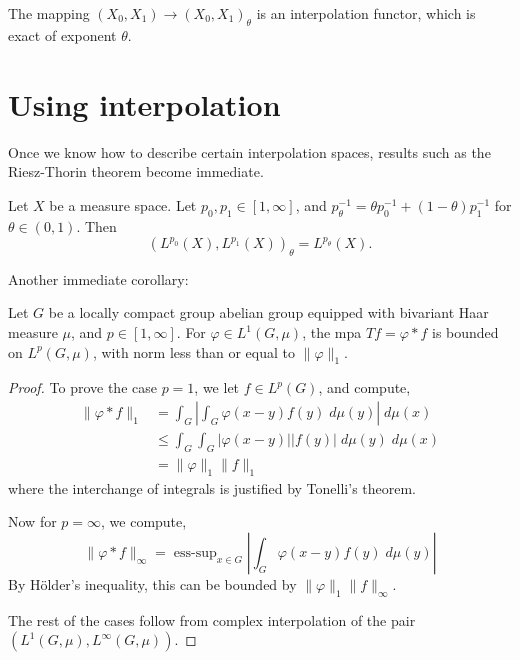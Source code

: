 \begin{proposition}
    The mapping $(X_0,X_1)\rightarrow (X_0,X_1)_\theta$ is an interpolation
    functor, which is exact of exponent $\theta$.
\end{proposition}

\section{Using interpolation}
Once we know how to describe certain interpolation spaces, results
such as the Riesz-Thorin theorem become immediate.
\begin{proposition}
    Let $X$ be a measure space.
    Let $p_0,p_1 \in [1,\infty]$, and $p_\theta^{-1} = \theta p_0^{-1}+(1-\theta)p_1^{-1}$
    for $\theta \in (0,1)$.
    Then
    \begin{equation*}
        (L^{p_0}(X),L^{p_1}(X))_\theta = L^{p_\theta}(X).
    \end{equation*}
\end{proposition}

Another immediate corollary:
\begin{proposition}
    Let $G$ be a locally compact group abelian group equipped
    with bivariant Haar measure $\mu$, and $p \in [1,\infty]$. For $\varphi \in L^1(G,\mu)$, the mpa
    $Tf = \varphi * f$ is bounded on $L^p(G,\mu)$, with norm less than or equal
    to $\|\varphi\|_1$.
\end{proposition}
\begin{proof}
    To prove the case $p = 1$, we let $f \in L^p(G)$, and compute,
    \begin{align*}
        \|\varphi * f\|_1 &= \int_G \left|\int_G\varphi(x-y)f(y)\;d\mu(y)\right|\;d\mu(x)\\
        &\leq \int_G \int_G |\varphi(x-y)||f(y)|\;d\mu(y)\;d\mu(x)\\
        &= \|\varphi\|_1\|f\|_1
    \end{align*}
    where the interchange of integrals is justified by Tonelli's theorem.
    
    Now for $p = \infty$, we compute,
    \begin{equation*}
        \|\varphi*f\|_\infty = \operatorname{ess-sup}_{x \in G} \left|\int_G \varphi(x-y)f(y)\;d\mu(y)\right|
    \end{equation*}
    By H\"older's inequality, this can be bounded by $\|\varphi\|_1\|f\|_\infty$.
    
    The rest of the cases
    follow from complex interpolation of the pair $(L^1(G,\mu),L^\infty(G,\mu))$.
\end{proof} 

\begin{proposition}
    
\end{proposition}

